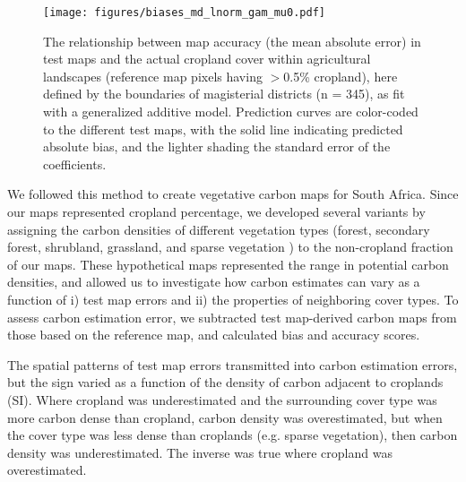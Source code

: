 \documentclass{pnastwo}
\begin{document}
\begin{article}
\begin{figure}[!h]
\centerline{\texttt{[image: figures/biases\_md\_lnorm\_gam\_mu0.pdf]}}
\caption{The relationship between map accuracy (the mean absolute error) in test maps and the actual cropland cover within agricultural landscapes (reference map pixels having $>$0.5\% cropland), here defined by the boundaries of magisterial districts (n = 345), as fit with a generalized additive model. Prediction curves are color-coded to the different test maps, with the solid line indicating predicted absolute bias, and the lighter shading the standard error of the coefficients.}\label{afoto2}
\end{figure}

We followed this method to create vegetative carbon maps for South Africa. Since our maps represented cropland percentage, we developed several variants by assigning the carbon densities of different vegetation types (forest, secondary forest, shrubland, grassland, and sparse vegetation \cite{ruesch_new_2008}) to the non-cropland fraction of our maps. These hypothetical maps represented the range in potential carbon densities, and allowed us to investigate how carbon estimates can vary as a function of i) test map errors and ii) the properties of neighboring cover types. To assess carbon estimation error, we subtracted test map-derived carbon maps from those based on the reference map, and calculated bias and accuracy scores. 

The spatial patterns of test map errors transmitted into carbon estimation errors, but the sign varied as a function of the density of carbon adjacent to croplands (SI). Where cropland was underestimated and the surrounding cover type was more carbon dense than cropland, carbon density was overestimated, but when the cover type was less dense than croplands (e.g. sparse vegetation), then carbon density was underestimated. The inverse was true where cropland was overestimated. 


\end{article}
\end{document}
